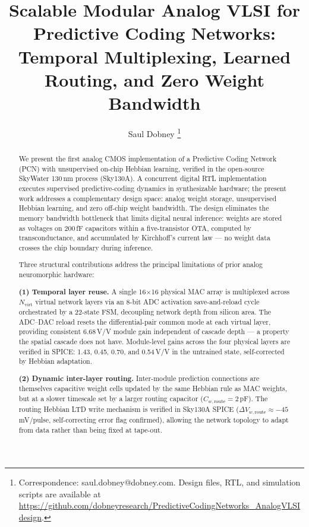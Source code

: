 \documentclass[journal,10pt,twoside]{IEEEtran}
\begin{document}
\title{Scalable Modular Analog VLSI for Predictive Coding Networks:\\
       Temporal Multiplexing, Learned Routing, and Zero Weight Bandwidth}

\author{Saul Dobney%
  \thanks{Correspondence: saul.dobney@dobney.com.
  Design files, RTL, and simulation scripts are available at
  \url{https://github.com/dobneyresearch/PredictiveCodingNetworks_AnalogVLSIdesign}.}%
}

\maketitle

\begin{abstract}
We present the first analog CMOS implementation of a Predictive Coding
Network (PCN) with unsupervised on-chip Hebbian learning, verified in the
open-source SkyWater 130\,nm process (Sky130A).
A concurrent digital RTL implementation~\cite{oh2026synthesizable} executes
supervised predictive-coding dynamics in synthesizable hardware; the present
work addresses a complementary design space: analog weight storage,
unsupervised Hebbian learning, and zero off-chip weight bandwidth.
The design eliminates the memory bandwidth bottleneck that limits digital
neural inference: weights are stored as voltages on 200\,fF capacitors
within a five-transistor OTA, computed by transconductance, and accumulated
by Kirchhoff's current law — no weight data crosses the chip boundary
during inference.

Three structural contributions address the principal limitations of prior
analog neuromorphic hardware:

\textbf{(1) Temporal layer reuse.}
A single 16$\times$16 physical MAC array is multiplexed across $N_\text{virt}$
virtual network layers via an 8-bit ADC activation save-and-reload cycle
orchestrated by a 22-state FSM, decoupling network depth from silicon area.
The ADC--DAC reload resets the differential-pair common mode at each virtual
layer, providing consistent 6.68\,V/V module gain independent of cascade
depth — a property the spatial cascade does not have.
Module-level gains across the four physical layers are verified in SPICE:
1.43, 0.45, 0.70, and 0.54\,V/V in the untrained state,
self-corrected by Hebbian adaptation.

\textbf{(2) Dynamic inter-layer routing.}
Inter-module prediction connections are themselves capacitive weight cells
updated by the same Hebbian rule as MAC weights, but at a slower timescale
set by a larger routing capacitor ($C_{w,\text{route}} = 2$\,pF).
The routing Hebbian LTD write mechanism is verified in Sky130A SPICE
($\Delta V_{w,\text{route}} \approx -45$\,mV/pulse, self-correcting error
flag confirmed), allowing the network topology to adapt from data rather
than being fixed at tape-out.


\end{abstract}
\end{document}
